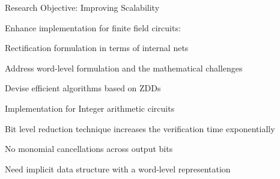 \begin{frame}{\large Research Objective: Improving Scalability}
\bi
	\item Enhance implementation for finite field circuits:
	\bi
		\item Rectification formulation in terms of internal nets
		\item Address word-level formulation and the mathematical challenges
		\item Devise efficient algorithms based on ZDDs
	\ei
	\vspace{0.2in}
	\item Implementation for Integer arithmetic circuits
	\bi
		\item Bit level reduction technique increases the verification time exponentially
		\bi
			\item No monomial cancellations across output bits
		\ei
		\item Need implicit data structure with a word-level representation
	\ei
\ei
\end{frame}

